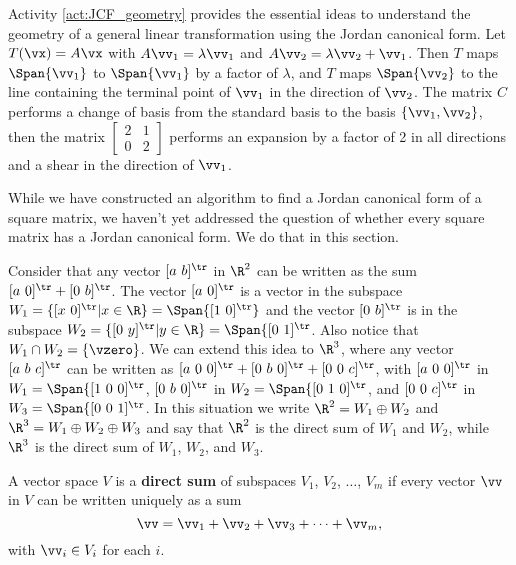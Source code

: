 Activity \ref{act:JCF_geometry} provides the essential ideas to understand the geometry of a general linear transformation using the Jordan canonical form. Let $T(\vx) = A\vx$ with  $A \vv_1 = \lambda \vv_1$ and $A \vv_2 = \lambda \vv_2 + \vv_1$. Then $T$ maps $\Span \{\vv_1\}$ to $\Span \{\vv_1\}$ by a factor of $\lambda$, and $T$ maps $\Span\{\vv_2\}$ to the line containing the terminal point of $\vv_1$ in the direction of $\vv_2$. 
The matrix $C$ performs a change of basis from the standard basis to the basis $\{\vv_1, \vv_2\}$, then the matrix $\left[ \begin{array}{cc} 2&1\\0&2 \end{array} \right]$ performs an expansion by a factor of 2 in all directions and a shear in the direction of $\vv_1$. 

\label{sec:jordan_proof}

While we have constructed an algorithm to find a Jordan canonical form of a square matrix, we haven't yet addressed the question of whether every square matrix has a Jordan canonical form. We do that in this section. 

Consider that any vector $[a \ b]^{\tr}$ in $\R^2$ can be written as the sum $[a \ 0]^{\tr} + [0 \ b]^{\tr}$. The vector $[a \ 0]^{\tr}$ is a vector in the subspace $W_1 = \{ [x \ 0]^{\tr} | x \in \R\} = \Span \{[1 \ 0]^{\tr}\}$ and the vector $[0 \ b]^{\tr}$ is in the subspace $W_2 = \{[0 \ y]^{\tr} | y \in \R\} = \Span\{[0 \ 1]^{\tr}$. Also notice that $W_1 \cap W_2 = \{\vzero\}$. We can extend this idea to $\R^3$, where any vector $[a \ b \ c]^{\tr}$ can be written as $[a \ 0 \ 0]^{\tr} + [0 \ b \ 0]^{\tr} + [0 \ 0 \ c]^{\tr}$, with $[a \ 0 \ 0]^{\tr}$ in $W_1 =  \Span\{[1 \ 0 \ 0]^{\tr}$, $[0 \ b \ 0]^{\tr}$ in $W_2 =  \Span\{[0 \ 1 \ 0]^{\tr}$,  and $[0 \ 0 \ c]^{\tr}$ in $W_3 =  \Span\{[0 \ 0 \ 1]^{\tr}$. In this situation we write $\R^2 = W_1 \oplus W_2$ and $\R^3 = W_1 \oplus W_2 \oplus W_3$ and say that $\R^2$ is the direct sum of $W_1$ and $W_2$, while $\R^3$ is the direct sum of $W_1$, $W_2$, and $W_3$. 

\begin{definition} A vector space $V$ is a \textbf{direct sum} of subspaces $V_1$, $V_2$, $\ldots$, $V_m$ if every vector $\vv$ in $V$ can be written uniquely as a sum
\[\vv = \vv_1+\vv_2+\vv_3+\cdots + \vv_m,\]
with $\vv_i \in V_i$ for each $i$. 
\end{definition}


